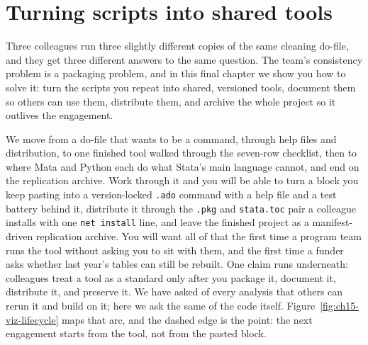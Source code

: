 \chapter{Turning scripts into shared tools}\label{ch:tools}

Three colleagues run three slightly different copies of the same cleaning do-file, and they get three different answers to the same question. The team's consistency problem is a packaging problem, and in this final chapter we show you how to solve it: turn the scripts you repeat into shared, versioned tools, document them so others can use them, distribute them, and archive the whole project so it outlives the engagement.

We move from a do-file that wants to be a command, through help files and distribution, to one finished tool walked through the seven-row checklist, then to where Mata and Python each do what Stata's main language cannot, and end on the replication archive. Work through it and you will be able to turn a block you keep pasting into a version-locked \texttt{.ado} command with a help file and a test battery behind it, distribute it through the \texttt{.pkg} and \texttt{stata.toc} pair a colleague installs with one \texttt{net install} line, and leave the finished project as a manifest-driven replication archive. You will want all of that the first time a program team runs the tool without asking you to sit with them, and the first time a funder asks whether last year's tables can still be rebuilt. One claim runs underneath: colleagues treat a tool as a standard only after you package it, document it, distribute it, and preserve it. We have asked of every analysis that others can rerun it and build on it; here we ask the same of the code itself. Figure~\ref{fig:ch15-viz-lifecycle} maps that arc, and the dashed edge is the point: the next engagement starts from the tool, not from the pasted block.

